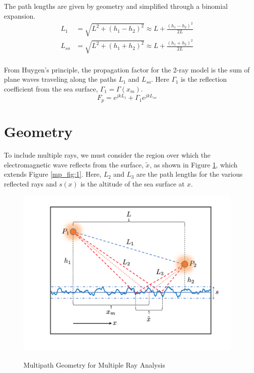 The path lengths are given by geometry and simplified through a binomial expansion.
\begin{equation}
\begin{aligned}
L_1 & = \sqrt{L^2 + (h_1-h_2)^2}  \approx L + \frac{(h_1 - h_2)^2}{2L}\\
L_{so} & = \sqrt{L^2 + (h_1+h_2)^2}  \approx L + \frac{(h_1 + h_2)^2}{2L}\\
\end{aligned}
\label{mp_eq:1}
\end{equation}
\renewcommand{\baselinestretch}{2} \small\normalsize

From Huygen's principle, the propagation factor for the 2-ray model is the sum of plane waves traveling along the paths $L_1$ and $L_{so}$. Here $\Gamma_1$ is the reflection coefficient from the sea surface, $\Gamma_1 = \Gamma(x_m)$.
\begin{equation}
\boxed{F_p = e^{jkL_1} + \Gamma_1e^{jkL_{so}}}
\label{mp_eq:1b}
\end{equation}

\section{Geometry}
To include multiple rays, we must consider the region over which the electromagnetic wave reflects from the surface, $\tilde{x}$, as shown in Figure \ref{mp_fig:2}, which extends Figure \ref{mp_fig:1}. Here, $L_2$ and $L_3$ are the path lengths for the various reflected rays and $s(x)$ is the altitude of the sea surface at $x$. 

\begin{figure}[H]
  \begin{center}
\includegraphics[width=5in]{../media/analysis/multipath_layout.png}
  \end{center}
  \renewcommand{\baselinestretch}{1} \small\normalsize
  \begin{quote}
    \caption[Multipath Geometry for Multiple Ray Analysis]{Multipath Geometry for Multiple Ray Analysis\label{mp_fig:2}}
  \end{quote}
\end{figure}
\renewcommand{\baselinestretch}{2} \small\normalsize

